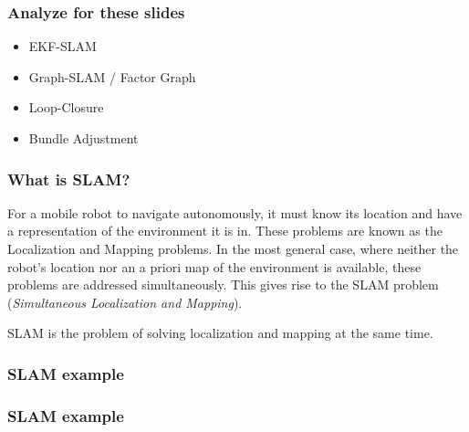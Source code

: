 \begin{frame}
    \frametitle{Analyze for these slides}
    
    \begin{itemize}
    \item EKF-SLAM
    \item Graph-SLAM / Factor Graph
    \item Loop-Closure
    \item Bundle Adjustment
    \end{itemize}
    
    \end{frame}
    
    \begin{frame}
    \frametitle{What is SLAM?}
    
    For a mobile robot to navigate autonomously, it must know its location and have a representation of the environment it is in. These problems are known as the Localization and Mapping problems. In the most general case, where neither the robot's location nor an a priori map of the environment is available, these problems are addressed simultaneously. This gives rise to the SLAM problem (\emph{Simultaneous Localization and Mapping}).
    \begin{block}{}
    SLAM is the problem of solving localization and mapping at the same time.
    \end{block}
    
    \end{frame}
    
    
    \begin{frame}
     \frametitle{SLAM example}
    
     \begin{figure}
     \hfill{}
     \end{figure}
    
    \end{frame}
    
    \begin{frame}
     \frametitle{SLAM example}

     \begin{figure}
     \hfill{}
     \end{figure}
    
    \end{frame}
    
